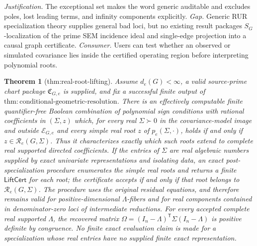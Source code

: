 \documentclass{article}
\newtheorem{theorem}{Theorem}
\begin{document}
\par\smallskip\noindent \textit{Justification.} The exceptional set makes the word generic auditable and excludes poles, lost leading terms, and infinity components explicitly. \textit{Gap.} Generic RUR specialization theory supplies general bad loci, but no existing result packages \(S_G\)-localization of the prime SEM incidence ideal and single-edge projection into a causal graph certificate. \textit{Consumer.} Users can test whether an observed or simulated covariance lies inside the certified operating region before interpreting polynomial roots.

\begin{theorem}[thm:real-root-lifting]\label{thm:real-root-lifting}
Assume \(d_e(G)<\infty\), a valid source-prime chart package \(\mathfrak C_{G,e}\) is supplied, and fix a successful finite output of \(\mathrm{thm:conditional\mbox{-}geometric\mbox{-}resolution}\). There is an effectively computable finite quantifier-free Boolean combination of polynomial sign conditions with rational coefficients in \((\Sigma,z)\) which, for every real \(\Sigma\succ0\) in the covariance-model image and outside \(\mathcal E_{G,e}\) and every simple real root \(z\) of \(p_e(\Sigma,\cdot)\), holds if and only if \(z\in\mathcal R_e(G,\Sigma)\). Thus it characterizes exactly which such roots extend to complete real supported directed coefficients. If the entries of \(\Sigma\) are real algebraic numbers supplied by exact univariate representations and isolating data, an exact post-specialization procedure enumerates the simple real roots and returns a finite \(\mathsf{LiftCert}\) for each root; the certificate accepts if and only if that root belongs to \(\mathcal R_e(G,\Sigma)\). The procedure uses the original residual equations, and therefore remains valid for positive-dimensional \(\Lambda\)-fibers and for real components contained in denominator-zero loci of intermediate reductions. For every accepted complete real supported \(\Lambda\), the recovered matrix \(\Omega=(I_n-\Lambda)^{\mathsf T}\Sigma(I_n-\Lambda)\) is positive definite by congruence. No finite exact evaluation claim is made for a specialization whose real entries have no supplied finite exact representation.
\end{theorem}
\end{document}
